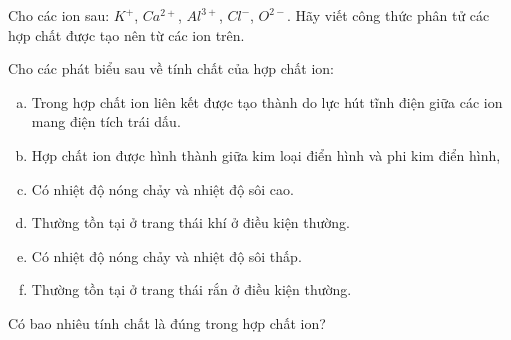 \begin{bt}
	Cho các ion sau: $K^+$, $Ca^{2+}$, $Al^{3+}$, $Cl^-$, $O^{2-}$. Hãy viết công thức phân tử các hợp chất được tạo nên từ các ion trên.
\end{bt}
\begin{bt}
	Cho các phát biểu sau về tính chất của hợp chất ion:
	\begin{enumerate}[(a)]
		\item Trong hợp chất ion liên kết được tạo thành do lực hút tĩnh điện giữa các ion mang điện tích trái dấu.
		\item Hợp chất ion được hình thành giữa kim loại điển hình và phi kim điển hình,
		\item Có nhiệt độ nóng chảy và nhiệt độ sôi cao.
		\item Thường tồn tại ở trang thái khí ở điều kiện thường.
		\item Có nhiệt độ nóng chảy và nhiệt độ sôi thấp.
		\item Thường tồn tại ở trang thái rắn ở điều kiện thường.
	\end{enumerate}
	Có bao nhiêu tính chất là đúng trong hợp chất ion?
\end{bt}
